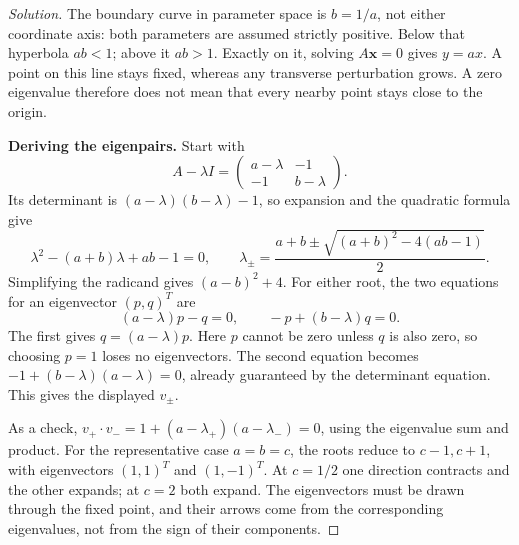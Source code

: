 \documentclass[10pt]{amsart}
\newenvironment{solution}
{\begin{proof}[Solution]}
{\end{proof}}
\begin{document}
\begin{enumerate}[label=\arabic*), leftmargin=*, itemsep=1em]
\begin{solution}
The boundary curve in parameter space is $b=1/a$, not either coordinate axis: both parameters are assumed strictly positive. Below that hyperbola $ab<1$; above it $ab>1$. Exactly on it, solving $A\mathbf x=0$ gives $y=ax$. A point on this line stays fixed, whereas any transverse perturbation grows. A zero eigenvalue therefore does not mean that every nearby point stays close to the origin.


\medskip\noindent\textbf{Deriving the eigenpairs.}
Start with
\[
A-\lambda I=\begin{pmatrix}a-\lambda&-1\\-1&b-\lambda\end{pmatrix}.
\]
Its determinant is $(a-\lambda)(b-\lambda)-1$, so expansion and the quadratic formula give
\[
\lambda^2-(a+b)\lambda+ab-1=0,\qquad
\lambda_\pm=\frac{a+b\pm\sqrt{(a+b)^2-4(ab-1)}}2.
\]
Simplifying the radicand gives $(a-b)^2+4$. For either root, the two equations for an eigenvector $(p,q)^T$ are
\[
(a-\lambda)p-q=0,\qquad -p+(b-\lambda)q=0.
\]
The first gives $q=(a-\lambda)p$. Here $p$ cannot be zero unless $q$ is also zero, so choosing $p=1$ loses no eigenvectors. The second equation becomes $-1+(b-\lambda)(a-\lambda)=0$, already guaranteed by the determinant equation. This gives the displayed $v_\pm$.

As a check, $v_+\cdot v_-=1+(a-\lambda_+)(a-\lambda_-)=0$, using the eigenvalue sum and product. For the representative case $a=b=c$, the roots reduce to $c-1,c+1$, with eigenvectors $(1,1)^T$ and $(1,-1)^T$. At $c=1/2$ one direction contracts and the other expands; at $c=2$ both expand. The eigenvectors must be drawn through the fixed point, and their arrows come from the corresponding eigenvalues, not from the sign of their components.


\end{solution}
\end{enumerate}
\end{document}

